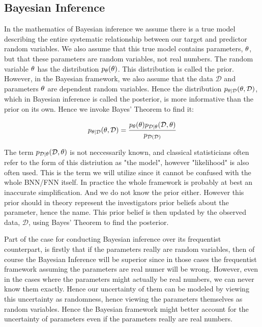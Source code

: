 \documentclass[nofootinbib,UKenglish,nobalancelastpage,12pt]{article}
\newcommand{\vect}{\ensuremath{\mathbf}}
\begin{document}
\clearpage

\subsection{Bayesian Inference}
In the mathematics of Bayesian inference we assume there is a true model describing the entire systematic relationship between our target and predictor random variables. We also assume that this true model contains parameters, $\vect{\theta}$, but that these parameters are random variables, not real numbers. The random variable $\vect{\theta}$ has the distribution $p_{\vect{\theta}}(\vect{\theta})$. This distribution is called the prior. However, in the Bayesian framework, we also assume that the data $\mathcal{D}$ and parameters $\vect{\theta}$ are dependent random variables. Hence the distribution $p_{\vect{\theta}|\mathcal{D}}(\vect{\theta},\mathcal{D})$, which in Bayesian inference is called the posterior, is more informative than the prior on its own. Hence we invoke Bayes' Theorem to find it:

$$
p_{\vect{\theta}|\mathcal{D}}(\vect{\theta},\mathcal{D}) = 
\frac{ p_{\vect{\theta}}(\theta)p_{\mathcal{D}|\vect{\theta}}(\mathcal{D},\vect{\theta}) }{p_{\mathcal{D}(\mathcal{D})}}
$$

The term $p_{\mathcal{D}|\vect{\theta}}(\mathcal{D},\vect{\theta})$ is not neccessarily known, and classical statisticians often refer to the form of this distriution as "the model", however "likelihood" is also often used. This is the term we will utilize since it cannot be confused with the whole BNN/FNN itself. In practice the whole framework is probably at best an inaccurate simplification. And we do not know the prior either. However this prior should in theory represent the investigators prior beliefs about the parameter, hence the name. This prior belief is then updated by the observed data, $\mathcal{D}$, using Bayes' Theorem to find the posterior. 

Part of the case for conducting Bayesian inference over its frequentist counterpart, is firstly that if the parameters really are random variables, then of course the Bayesian Inference will be superior since in those cases the frequentist framework assuming the parameters are real numer will be wrong. However, even in the cases where the parameters might actually be real numbers, we can never know them exactly. Hence our uncertainty of them can be modeled by viewing this uncertainty as randomness, hence viewing the parameters themselves as random variables. Hence the Bayesian framework might better account for the uncertainty of parameters even if the parameters really are real numbers.
\clearpage
\end{document}
